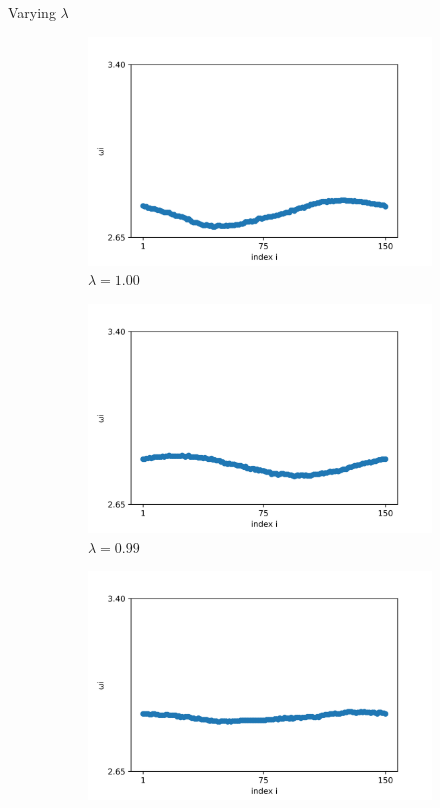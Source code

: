 \documentclass{beamer}
\begin{document}
\begin{frame}{Varying $\lambda$}
\begin{figure}[H]
\begin{subfigure}{.32\textwidth}
  \centering
  \includegraphics[width=1\linewidth]{w_lambda=1.0_t=2000.png}  
  \caption{$\lambda=1.00$}
\end{subfigure}
\hfill
\begin{subfigure}{.32\textwidth}
  \centering
  \includegraphics[width=1\linewidth]{w_lambda=0.99_t=2000.png}  
  \caption{$\lambda=0.99$}
\end{subfigure}
\hfill
\begin{subfigure}{.32\textwidth}
  \centering
  \includegraphics[width=1\linewidth]{w_lambda=0.98_t=2000}  

\end{subfigure}
\end{figure}
\end{frame}
\end{document}
